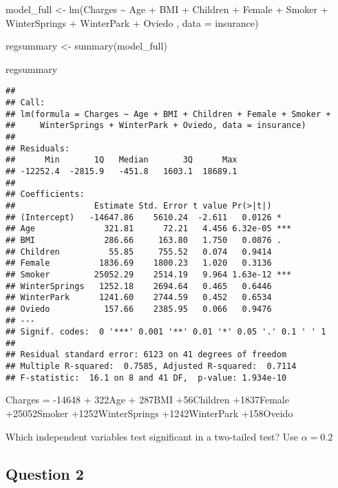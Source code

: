 \documentclass[
]{article}
\newenvironment{Shaded}{\begin{snugshade}}{\end{snugshade}}
\newcommand{\AttributeTok}[1]{\textcolor[rgb]{0.77,0.63,0.00}{#1}}
\newcommand{\FunctionTok}[1]{\textcolor[rgb]{0.00,0.00,0.00}{#1}}
\newcommand{\NormalTok}[1]{#1}
\newcommand{\OtherTok}[1]{\textcolor[rgb]{0.56,0.35,0.01}{#1}}
\newcommand{\SpecialCharTok}[1]{\textcolor[rgb]{0.00,0.00,0.00}{#1}}
\begin{document}
\begin{Shaded}
\begin{Highlighting}[]
\NormalTok{model\_full }\OtherTok{\textless{}{-}} \FunctionTok{lm}\NormalTok{(Charges }\SpecialCharTok{\textasciitilde{}}\NormalTok{ Age }\SpecialCharTok{+}\NormalTok{ BMI }\SpecialCharTok{+}\NormalTok{ Children }\SpecialCharTok{+}\NormalTok{ Female }\SpecialCharTok{+}\NormalTok{ Smoker }\SpecialCharTok{+}\NormalTok{ WinterSprings }\SpecialCharTok{+}\NormalTok{ WinterPark }\SpecialCharTok{+}\NormalTok{ Oviedo , }\AttributeTok{data =}\NormalTok{ insurance)}

\NormalTok{regsummary }\OtherTok{\textless{}{-}} \FunctionTok{summary}\NormalTok{(model\_full)}

\NormalTok{regsummary}
\end{Highlighting}
\end{Shaded}

\begin{verbatim}
## 
## Call:
## lm(formula = Charges ~ Age + BMI + Children + Female + Smoker + 
##     WinterSprings + WinterPark + Oviedo, data = insurance)
## 
## Residuals:
##      Min       1Q   Median       3Q      Max 
## -12252.4  -2815.9   -451.8   1603.1  18689.1 
## 
## Coefficients:
##                Estimate Std. Error t value Pr(>|t|)    
## (Intercept)   -14647.86    5610.24  -2.611   0.0126 *  
## Age              321.81      72.21   4.456 6.32e-05 ***
## BMI              286.66     163.80   1.750   0.0876 .  
## Children          55.85     755.52   0.074   0.9414    
## Female          1836.69    1800.23   1.020   0.3136    
## Smoker         25052.29    2514.19   9.964 1.63e-12 ***
## WinterSprings   1252.18    2694.64   0.465   0.6446    
## WinterPark      1241.60    2744.59   0.452   0.6534    
## Oviedo           157.66    2385.95   0.066   0.9476    
## ---
## Signif. codes:  0 '***' 0.001 '**' 0.01 '*' 0.05 '.' 0.1 ' ' 1
## 
## Residual standard error: 6123 on 41 degrees of freedom
## Multiple R-squared:  0.7585, Adjusted R-squared:  0.7114 
## F-statistic:  16.1 on 8 and 41 DF,  p-value: 1.934e-10
\end{verbatim}

Charges = -14648 + 322Age + 287BMI +56Children +1837Female +25052Smoker
+1252WinterSprings +1242WinterPark +158Oveido

Which independent variables test significant in a two-tailed test? Use
\(\alpha = 0.2\)

\hypertarget{question-2}{%
\subsection{Question 2}\label{question-2}}
\end{document}

